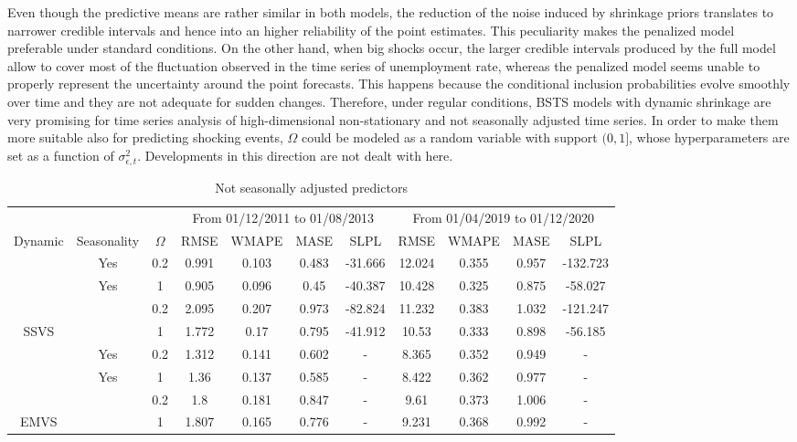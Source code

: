 \documentclass[
  12pt,
]{book}
\theoremstyle{break}
\theoremstyle{nonumberplain}
\begin{document}
Even though the predictive means are rather similar in both models, the
reduction of the noise induced by shrinkage priors translates to
narrower credible intervals and hence into an higher reliability of the
point estimates. This peculiarity makes the penalized model preferable
under standard conditions. On the other hand, when big shocks occur, the
larger credible intervals produced by the full model allow to cover most
of the fluctuation observed in the time series of unemployment rate,
whereas the penalized model seems unable to properly represent the
uncertainty around the point forecasts. This happens because the
conditional inclusion probabilities evolve smoothly over time and they
are not adequate for sudden changes. Therefore, under regular
conditions, BSTS models with dynamic shrinkage are very promising for
time series analysis of high-dimensional non-stationary and not
seasonally adjusted time series. In order to make them more suitable
also for predicting shocking events, \(\Omega\) could be modeled as a
random variable with support \((0,1]\), whose hyperparameters are set as
a function of \(\sigma^{2}_{\epsilon,t}\). Developments in this
direction are not dealt with here.

\begin{table}[H]

\caption{\label{tab:mytab31}Not seasonally adjusted predictors}
\centering
\fontsize{8}{10}\selectfont
\begin{tabular}[t]{>{}ccccccccccc}
\toprule
\multicolumn{3}{c}{ } & \multicolumn{4}{c}{From 01/12/2011 to 01/08/2013} & \multicolumn{4}{c}{From 01/04/2019 to 01/12/2020} \\
\cmidrule(l{3pt}r{3pt}){4-7} \cmidrule(l{3pt}r{3pt}){8-11}
Dynamic & Seasonality & $\Omega$ & RMSE & WMAPE & MASE & SLPL & RMSE & WMAPE & MASE & SLPL\\
\midrule
 & Yes & 0.2 & 0.991 & 0.103 & 0.483 & -31.666 & 12.024 & 0.355 & 0.957 & -132.723\\
\cmidrule{2-11}
 & Yes & 1 & 0.905 & 0.096 & 0.45 & -40.387 & 10.428 & 0.325 & 0.875 & -58.027\\
\cmidrule{2-11}
 &  & 0.2 & 2.095 & 0.207 & 0.973 & -82.824 & 11.232 & 0.383 & 1.032 & -121.247\\
\cmidrule{2-11}
\multirow[t]{-4}{*}{\centering\arraybackslash SSVS} &  & 1 & 1.772 & 0.17 & 0.795 & -41.912 & 10.53 & 0.333 & 0.898 & -56.185\\
\cmidrule{1-11}
 & Yes & 0.2 & 1.312 & 0.141 & 0.602 & - & 8.365 & 0.352 & 0.949 & -\\
\cmidrule{2-11}
 & Yes & 1 & 1.36 & 0.137 & 0.585 & - & 8.422 & 0.362 & 0.977 & -\\
\cmidrule{2-11}
 &  & 0.2 & 1.8 & 0.181 & 0.847 & - & 9.61 & 0.373 & 1.006 & -\\
\cmidrule{2-11}
\multirow[t]{-4}{*}{\centering\arraybackslash EMVS} &  & 1 & 1.807 & 0.165 & 0.776 & - & 9.231 & 0.368 & 0.992 & -\\
\bottomrule
\end{tabular}
\end{table}
\end{document}
